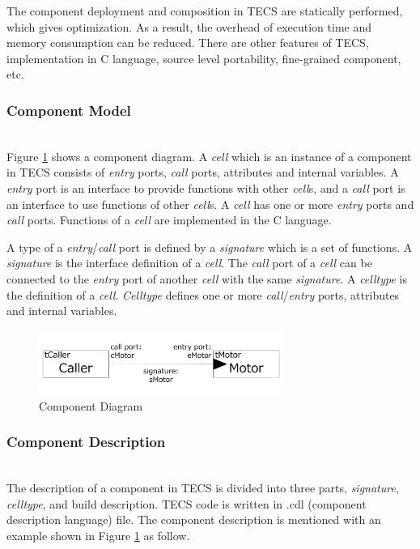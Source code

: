 \documentclass[conference,compsoc]{IEEEtran}
\begin{document}
The component deployment and composition in TECS are statically performed, which gives optimization.
As a result, the overhead of execution time and memory consumption can be reduced.
There are other features of TECS, implementation in C language, source level portability, fine-grained component, etc.

\subsubsection{Component Model}\mbox{}\\

Figure \ref{fig:component} shows a component diagram.
A {\it cell} which is an instance of a component in TECS consists of {\it entry} ports, {\it call} ports, attributes and internal variables.
A {\it entry} port is an interface to provide functions with other {\it cell}s, and a {\it call} port is an interface to use functions of other {\it cell}s.
A {\it cell} has one or more {\it entry} ports and {\it call} ports.
Functions of a {\it cell} are implemented in the C language.

A type of a {\it entry}/{\it call} port is defined by a {\it signature} which is a set of functions.
A {\it signature} is the interface definition of a {\it cell}.
The {\it call} port of a {\it cell} can be connected to the {\it entry} port of another {\it cell} with the same {\it signature}.
A {\it celltype} is the definition of a {\it cell}.
{\it Celltype} defines one or more {\it call}/{\it entry} ports, attributes and internal variables.

\begin{figure}[t]
    \centering
    \includegraphics[width=8cm,clip]{figure/component_diagram.pdf}
    \caption{Component Diagram}
    \label{fig:component}
\end{figure}

\subsubsection{Component Description}\mbox{}\\

The description of a component in TECS is divided into three parts, {\it signature}, {\it celltype}, and build description.
TECS code is written in .cdl (component description language) file.
The component description is mentioned with an example shown in Figure \ref{fig:component} as follow.
\end{document}
